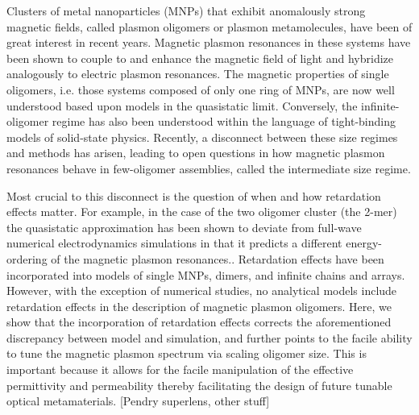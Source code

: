 \documentclass[journal=apchd5,manuscript=article]{achemso}
\begin{document}
Clusters of metal nanoparticles (MNPs) that exhibit anomalously strong magnetic fields, called plasmon oligomers or plasmon metamolecules, have been of great interest in recent years. Magnetic plasmon resonances in these systems have been shown to couple to and enhance the magnetic field of light and hybridize analogously to electric plasmon resonances\cite{Alu2006,Alu2008,Dionne2011,Cherqui2014,Dionne2016,Cherqui2016,Engheta2017}. The magnetic properties of single oligomers, i.e. those systems composed of only one ring of MNPs, are now well understood based upon models in the quasistatic limit\cite{Nord2006,Dionne2011,Dionne2016,Capolino2017}. Conversely, the infinite-oligomer regime has also been understood within the language of tight-binding models of solid-state physics\cite{Schatz2003,Weick2013}. Recently, a disconnect between these size regimes and methods has arisen, leading to open questions in how magnetic plasmon resonances behave in few-oligomer assemblies, called the intermediate size regime\cite{NordHal2011,NordHal2012,Cherqui2014,Cherqui2016,Engheta2017}.

Most crucial to this disconnect is the question of when and how retardation effects matter. For example, in the case of the two oligomer cluster (the 2-mer) the quasistatic approximation has been shown to deviate from full-wave numerical electrodynamics simulations in that it predicts a different energy-ordering of the magnetic plasmon resonances.\cite{Cherqui2014}. Retardation effects have been incorporated into models of single MNPs\cite{Gu2010}, dimers\cite{vonPlessen2007}, and infinite chains and arrays\cite{Kottman2001,Rechbacher2003,Schatz2003,Royer2005,Abajo2008,Chumanov2010,Pinchuk2016}. However, with the exception of numerical studies, no analytical models include retardation effects in the description of magnetic plasmon oligomers. Here, we show that the incorporation of retardation effects corrects the aforementioned discrepancy between model and simulation, and further points to the facile ability to tune the magnetic plasmon spectrum via scaling oligomer size. This is important because it allows for the facile manipulation of the effective permittivity and permeability thereby facilitating the design of future tunable optical metamaterials. [Pendry superlens, other stuff]
\end{document}
